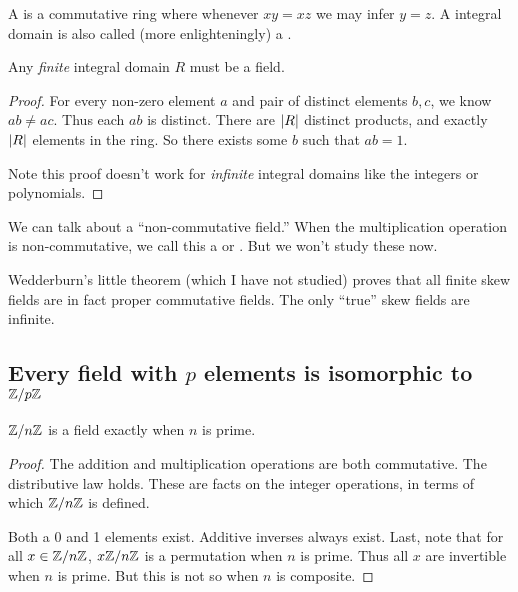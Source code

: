 \begin{definition}
  A  is a commutative ring where whenever $xy =
  xz$ we may infer $y = z$. A integral domain is also called (more
  enlighteningly) a .
\end{definition}

\begin{proposition}
  Any \emph{finite} integral domain $R$ must be a field.
\end{proposition}

\begin{proof}
  For every non-zero element $a$ and pair of distinct elements $b, c$,
  we know $ab \ne ac$. Thus each $ab$ is distinct. There are $|R|$
  distinct products, and exactly $|R|$ elements in the ring. So
  there exists some $b$ such that $ab = 1$.

  Note this proof doesn't work for \emph{infinite} integral domains like
  the integers or polynomials.
\end{proof}

\begin{definition}
  We can talk about a ``non-commutative field.'' When the multiplication
  operation is non-commutative, we call this a  or
  . But we won't study these now.

  Wedderburn's little theorem (which I have not studied) proves that all
  finite skew fields are in fact proper commutative fields. The only
  ``true'' skew fields are infinite.
\end{definition}

\subsection{Every field with $p$ elements is isomorphic to $\mathbb{Z} / p\mathbb{Z}$}

\begin{theorem}
  $\mathbb{Z} / n\mathbb{Z}$ is a field exactly when $n$ is prime.
\end{theorem}

\begin{proof}
  The addition and multiplication operations are both commutative. The
  distributive law holds. These are facts on the integer operations, in
  terms of which $\mathbb{Z} / n\mathbb{Z}$ is defined.

  Both a 0 and 1 elements exist. Additive inverses always exist. Last,
  note that for all $x \in \mathbb{Z} / n\mathbb{Z}$, $x\mathbb{Z} / n\mathbb{Z}$ is a permutation when $n$
  is prime. Thus all $x$ are invertible when $n$ is prime. But this is
  not so when $n$ is composite.
\end{proof}

